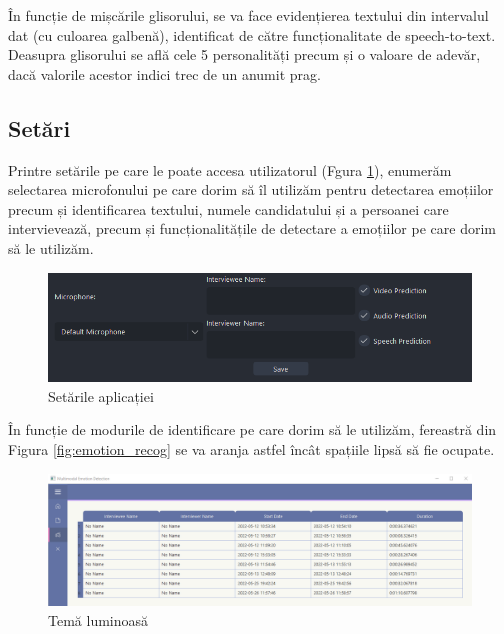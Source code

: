 \documentclass[a4paper, 12pt]{report}
\begin{document}
	În funcție de mișcările glisorului, se va face evidențierea textului din intervalul dat (cu culoarea galbenă), identificat de către funcționalitate de speech-to-text. Deasupra glisorului se află cele 5 personalități precum și o valoare de adevăr, dacă valorile acestor indici trec de un anumit prag.
	
	\clearpage
	\subsection{Setări}
	Printre setările pe care le poate accesa utilizatorul (Fgura \ref{fig:settings}), enumerăm selectarea microfonului pe care dorim să îl utilizăm pentru detectarea emoțiilor precum și identificarea textului, numele candidatului și a persoanei care intervievează, precum și funcționalitățile de detectare a emoțiilor pe care dorim să le utilizăm.
	
	\begin{figure}[H]
		\begin{center}
			\includegraphics[scale=0.65]{images/settings.png}
		\end{center}
		\caption{Setările aplicației}
		\label{fig:settings}
	\end{figure}

	În funcție de modurile de identificare pe care dorim să le utilizăm, fereastră din Figura \ref{fig:emotion_recog} se va aranja astfel încât spațiile lipsă să fie ocupate.
	
	\begin{figure}[H]
		\begin{center}
			\includegraphics[scale=0.3]{images/light_theme.png}
		\end{center}
		\caption{Temă luminoasă}
		\label{fig:light_theme}
	\end{figure}
	
\end{document}
